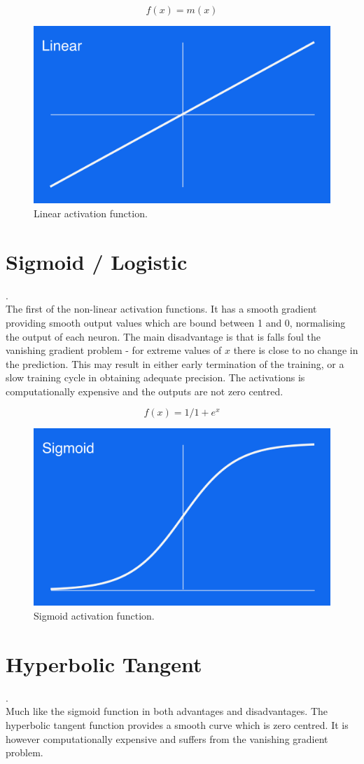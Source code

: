 \begin{equation}
    f(x) = m(x)
\end{equation}
\begin{figure}[H]
\centering
\includegraphics[width=.265\textwidth]{4fig/linear.png}
\caption{Linear activation function.}
\end{figure}

\section{Sigmoid / Logistic}.\\

The first of the non-linear activation functions. It has a smooth gradient providing smooth output values which are bound between 1 and 0, normalising the output of each neuron. The main disadvantage is that is falls foul the vanishing gradient problem - for extreme values of $x$ there is close to no change in the prediction. This may result in either early termination of the training, or a slow training cycle in obtaining adequate precision. The activations is computationally expensive and the outputs are not zero centred.

\begin{equation}
    f(x) = 1/1+e^x
\end{equation}
\begin{figure}[H]
\centering
\includegraphics[width=.265\textwidth]{4fig/sigmoid.png}
\caption{Sigmoid activation function.}
\end{figure}


\section{Hyperbolic Tangent}.\\
Much like the sigmoid function in both advantages and disadvantages. The hyperbolic tangent function provides a smooth curve which is zero centred. It is however computationally expensive and suffers from the vanishing gradient problem.

